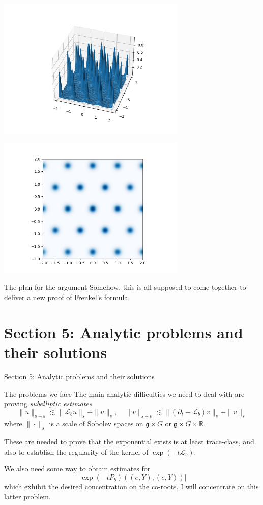 \documentclass{beamer}
\numberwithin{equation}{section}
\theoremstyle{plain}
\theoremstyle{plain}
\theoremstyle{definition}
\theoremstyle{plain}
\theoremstyle{plain}
\theoremstyle{definition}
\newcommand{\Rl}{\mathbb{R}}
\newcommand{\Lc}{\mathcal{L}}
\newcommand{\gf}{\mathfrak{g}}
\begin{document}
\begin{frame}
  \includegraphics[width=90mm]{spikes.png}
\end{frame}

\begin{frame}
  \includegraphics[width=90mm]{dots.png}
\end{frame}

\begin{frame}{The plan for the argument}
  Somehow, this is all supposed to come together to deliver a new proof of Frenkel's formula.
\end{frame}


\section{Section 5: Analytic problems and their solutions}

\begin{frame}
  \huge{Section 5: Analytic problems and their solutions}
\end{frame}

\begin{frame}{The problems we face}
  The main analytic difficulties we need to deal with are proving \emph{subelliptic estimates}
  \[
    \|u\|_{s+\varepsilon} \lesssim \|\Lc_bu\|_s+\|u\|_s,\quad \|v\|_{s+\varepsilon} \lesssim \|(\partial_t-\Lc_b)v\|_s+\|v\|_s
  \]
  where $\|\cdot\|_{s}$ is a scale of Sobolev spaces on $\gf\times G$ or $\gf\times G\times \Rl.$

  These are needed to prove that the exponential exists is at least trace-class, and also to establish the regularity of the kernel of $\exp(-t\Lc_b).$
\pause

  We also need some way to obtain estimates for
  \[
    |\exp(-tP_{b})((e,Y),(e,Y))|
  \]
  which exhibit the desired concentration on the co-roots. I will concentrate on this latter problem.
\end{frame}
\end{document}
